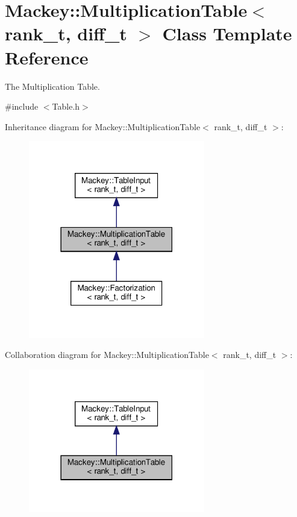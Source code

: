 \hypertarget{classMackey_1_1MultiplicationTable}{}\section{Mackey\+:\+:Multiplication\+Table$<$ rank\+\_\+t, diff\+\_\+t $>$ Class Template Reference}
\label{classMackey_1_1MultiplicationTable}


The Multiplication Table.  




{\ttfamily \#include $<$Table.\+h$>$}



Inheritance diagram for Mackey\+:\+:Multiplication\+Table$<$ rank\+\_\+t, diff\+\_\+t $>$\+:\nopagebreak
\begin{figure}[H]
\begin{center}
\leavevmode
\includegraphics[width=218pt]{classMackey_1_1MultiplicationTable__inherit__graph}
\end{center}
\end{figure}


Collaboration diagram for Mackey\+:\+:Multiplication\+Table$<$ rank\+\_\+t, diff\+\_\+t $>$\+:\nopagebreak
\begin{figure}[H]
\begin{center}
\leavevmode
\includegraphics[width=218pt]{classMackey_1_1MultiplicationTable__coll__graph}
\end{center}
\end{figure}
